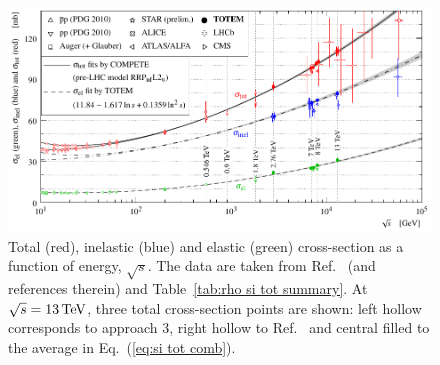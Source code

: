 \begin{figure}
\vskip-5mm
\begin{center}
\includegraphics{fig/sigma_tot_el_inel_vs_s.pdf}
\vskip-3mm
\caption{%
Total (red), inelastic (blue) and elastic (green) cross-section as a function of energy, $\sqrt s$. The data are taken from Ref.~\cite{totem-13tev-90m} (and references therein) and Table~\ref{tab:rho si tot summary}. At $\sqrt s = 13\,{\rm TeV}$, three total cross-section points are shown: left hollow corresponds to approach 3, right hollow to Ref.~\cite{totem-13tev-90m} and central filled to the average in Eq.~(\ref{eq:si tot comb}).
}
\label{fig:si tot inel el}
\end{center}
\vskip-3mm
\end{figure}
